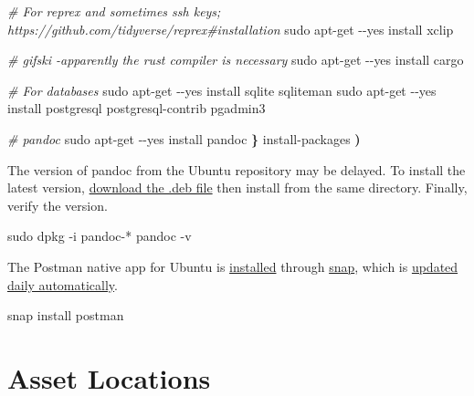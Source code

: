 \documentclass[
]{book}
\newenvironment{Shaded}{\begin{snugshade}}{\end{snugshade}}
\newcommand{\CommentTok}[1]{\textcolor[rgb]{0.56,0.35,0.01}{\textit{#1}}}
\newcommand{\ExtensionTok}[1]{#1}
\newcommand{\FunctionTok}[1]{\textcolor[rgb]{0.00,0.00,0.00}{#1}}
\newcommand{\KeywordTok}[1]{\textcolor[rgb]{0.13,0.29,0.53}{\textbf{#1}}}
\newcommand{\NormalTok}[1]{#1}
\begin{document}
\begin{Shaded}
\begin{Highlighting}[]
  \CommentTok{\# For reprex and sometimes ssh keys; https://github.com/tidyverse/reprex\#installation}
  \FunctionTok{sudo}\NormalTok{ apt{-}get {-}{-}yes install xclip}

  \CommentTok{\# gifski {-}apparently the rust compiler is necessary}
  \FunctionTok{sudo}\NormalTok{ apt{-}get {-}{-}yes install cargo}

  \CommentTok{\# For databases}
  \FunctionTok{sudo}\NormalTok{ apt{-}get {-}{-}yes install sqlite sqliteman}
  \FunctionTok{sudo}\NormalTok{ apt{-}get {-}{-}yes install postgresql postgresql{-}contrib pgadmin3}

  \CommentTok{\# pandoc}
  \FunctionTok{sudo}\NormalTok{ apt{-}get {-}{-}yes install pandoc}
\KeywordTok{\}}
\ExtensionTok{install{-}packages}
\KeywordTok{)}
\end{Highlighting}
\end{Shaded}

The version of pandoc from the Ubuntu repository may be delayed. To install the latest version, \href{https://github.com/jgm/pandoc/releases}{download the .deb file} then install from the same directory. Finally, verify the version.

\begin{Shaded}
\begin{Highlighting}[]
\FunctionTok{sudo}\NormalTok{ dpkg {-}i pandoc{-}*}
\ExtensionTok{pandoc}\NormalTok{ {-}v}
\end{Highlighting}
\end{Shaded}

The Postman native app for Ubuntu is \href{https://learning.getpostman.com/docs/postman/launching-postman/installation-and-updates/\#installing-postman-on-linux}{installed} through \href{https://tutorials.ubuntu.com/tutorial/basic-snap-usage}{snap}, which is \href{https://tutorials.ubuntu.com/tutorial/basic-snap-usage\#2}{updated daily automatically}.

\begin{Shaded}
\begin{Highlighting}[]
\ExtensionTok{snap}\NormalTok{ install postman}
\end{Highlighting}
\end{Shaded}

\hypertarget{asset-locations}{%
\section{Asset Locations}\label{asset-locations}}
\end{document}
